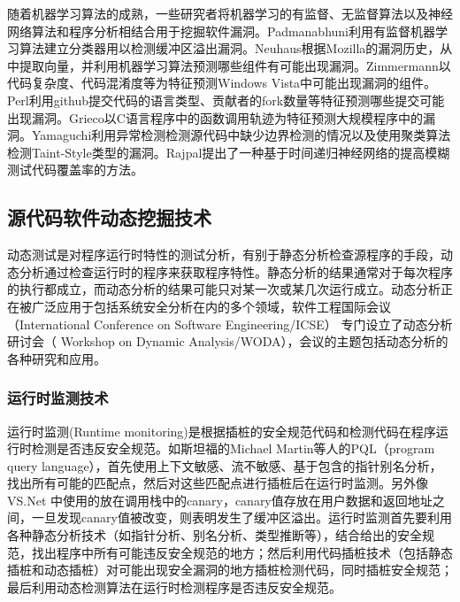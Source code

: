 随着机器学习算法的成熟，一些研究者将机器学习的有监督、无监督算法以及神经网络算法和程序分析相结合用于挖掘软件漏洞。Padmanabhuni利用有监督机器学习算法建立分类器用以检测缓冲区溢出漏洞。Neuhaus根据Mozilla的漏洞历史，从中提取向量，并利用机器学习算法预测哪些组件有可能出现漏洞。Zimmermann以代码复杂度、代码混淆度等为特征预测Windows Vista中可能出现漏洞的组件。Perl利用github提交代码的语言类型、贡献者的fork数量等特征预测哪些提交可能出现漏洞。Grieco以C语言程序中的函数调用轨迹为特征预测大规模程序中的漏洞。Yamaguchi利用异常检测检测源代码中缺少边界检测的情况以及使用聚类算法检测Taint-Style类型的漏洞。Rajpal提出了一种基于时间递归神经网络的提高模糊测试代码覆盖率的方法。


\subsection{源代码软件动态挖掘技术}

动态测试是对程序运行时特性的测试分析，有别于静态分析检查源程序的手段，动态分析通过检查运行时的程序来获取程序特性。静态分析的结果通常对于每次程序的执行都成立，而动态分析的结果可能只对某一次或某几次运行成立。动态分析正在被广泛应用于包括系统安全分析在内的多个领域，软件工程国际会议（International Conference on Software Engineering/ICSE） 专门设立了动态分析研讨会（ Workshop on Dynamic Analysis/WODA），会议的主题包括动态分析的各种研究和应用。

\subsubsection{运行时监测技术}

运行时监测(Runtime monitoring)是根据插桩的安全规范代码和检测代码在程序运行时检测是否违反安全规范。如斯坦福的Michael Martin等人的PQL（program query language），首先使用上下文敏感、流不敏感、基于包含的指针别名分析，找出所有可能的匹配点，然后对这些匹配点进行插桩后在运行时监测。另外像VS.Net 中使用的放在调用栈中的canary，canary值存放在用户数据和返回地址之间，一旦发现canary值被改变，则表明发生了缓冲区溢出。运行时监测首先要利用各种静态分析技术（如指针分析、别名分析、类型推断等），结合给出的安全规范，找出程序中所有可能违反安全规范的地方；然后利用代码插桩技术（包括静态插桩和动态插桩）对可能出现安全漏洞的地方插桩检测代码，同时插桩安全规范；最后利用动态检测算法在运行时检测程序是否违反安全规范。

